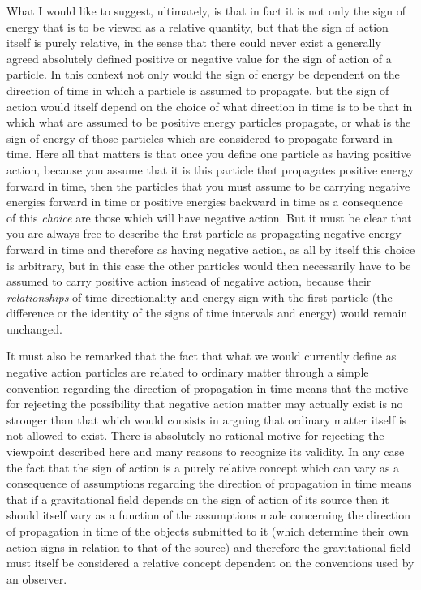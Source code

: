 \documentclass[notitlepage,12pt]{report}
\begin{document}
What I would like to suggest, ultimately, is that in fact it is not only the sign of energy that is to be viewed as a relative quantity, but that the sign of action itself is purely relative, in the sense that there could never exist a generally agreed absolutely defined positive or negative value for the sign of action of a particle. In this context not only would the sign of energy be dependent on the direction of time in which a particle is assumed to propagate, but the sign of action would itself depend on the choice of what direction in time is to be that in which what are assumed to be positive energy particles propagate, or what is the sign of energy of those particles which are considered to propagate forward in time. Here all that matters is that once you define one particle as having positive action, because you assume that it is this particle that propagates positive energy forward in time, then the particles that you must assume to be carrying negative energies forward in time or positive energies backward in time as a consequence of this \textit{choice} are those which will have negative action. But it must be clear that you are always free to describe the first particle as propagating negative energy forward in time and therefore as having negative action, as all by itself this choice is arbitrary, but in this case the other particles would then necessarily have to be assumed to carry positive action instead of negative action, because their \textit{relationships} of time directionality and energy sign with the first particle (the difference or the identity of the signs of time intervals and energy) would remain unchanged.

It must also be remarked that the fact that what we would currently define as negative action particles are related to ordinary matter through a simple convention regarding the direction of propagation in time means that the motive for rejecting the possibility that negative action matter may actually exist is no stronger than that which would consists in arguing that ordinary matter itself is not allowed to exist. There is absolutely no rational motive for rejecting the viewpoint described here and many reasons to recognize its validity. In any case the fact that the sign of action is a purely relative concept which can vary as a consequence of assumptions regarding the direction of propagation in time means that if a gravitational field depends on the sign of action of its source then it should itself vary as a function of the assumptions made concerning the direction of propagation in time of the objects submitted to it (which determine their own action signs in relation to that of the source) and therefore the gravitational field must itself be considered a relative concept dependent on the conventions used by an observer.
\end{document}
